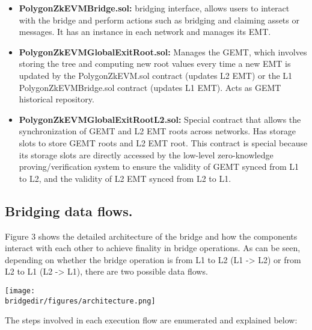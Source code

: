 \begin{itemize}
	\item \textbf{PolygonZkEVMBridge.sol:} bridging interface, allows users to interact with the bridge and perform actions such as bridging and claiming assets or messages. It has an instance in each network and manages its EMT.
	\item \textbf{PolygonZkEVMGlobalExitRoot.sol:} Manages the GEMT, which involves storing the tree and computing new root values every time a new EMT is updated by the PolygonZkEVM.sol contract (updates L2 EMT) or the L1 PolygonZkEVMBridge.sol contract (updates L1 EMT). Acts as GEMT historical repository.
	\item \textbf{PolygonZkEVMGlobalExitRootL2.sol:} Special contract that allows the synchronization of GEMT and L2 EMT roots across networks. Has storage slots to store GEMT roots and L2 EMT root. This contract is special because its storage slots are directly accessed by the low-level zero-knowledge proving/verification system to ensure the validity of GEMT synced from L1 to L2, and the validity of L2 EMT synced from L2 to L1.


\end{itemize}

\subsection{Bridging data flows.}

Figure 3 shows the detailed architecture of the bridge and how the components interact with each other to achieve finality in bridge operations. As can be seen, depending on whether the bridge operation is from L1 to L2 (L1 -> L2) or from L2 to L1 (L2 -> L1), there are two possible data flows. 

\begin{center}
	\texttt{[image: \\bridgedir/figures/architecture.png]}
	
	
\end{center}

The steps involved in each execution flow are enumerated and explained below:

